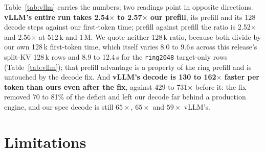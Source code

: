 \documentclass{article}
\begin{document}
Table~\ref{tab:vllm} carries the numbers; two readings point in
opposite directions.
\textbf{vLLM's entire run takes 2.54$\times$ to 2.57$\times$ our prefill}, its prefill and
its 128 decode steps against our first-token time; prefill against prefill the ratio is
2.52$\times$ and 2.56$\times$ at 512\,k and 1\,M. We quote neither 128\,k ratio,
because both divide by our own 128\,k first-token time, which itself varies 8.0 to 9.6\,s
across this release's split-KV 128\,k rows and 8.9 to 12.4\,s for the \texttt{ring2048}
target-only rows (Table~\ref{tab:vllm}); that prefill advantage
is a property of the ring prefill and is untouched by the decode fix. And \textbf{vLLM's
decode is 130 to 162$\times$ faster per token than ours even after the fix}, against 429 to
731$\times$ before it: the fix removed 70 to 81\% of the deficit and left our decode far
behind a production engine, and our spec decode is still $65\times$, $65\times$ and
$59\times$ vLLM's.

\section{Limitations}
\label{sec:limitations}
\end{document}
